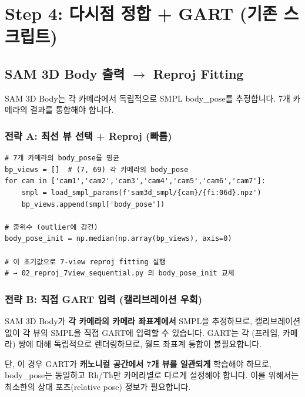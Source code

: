 \documentclass[11pt, a4paper]{report}
\begin{document}
\chapter{Step 4: 다시점 정합 + GART (기존 스크립트)}

\section{SAM 3D Body 출력 $\to$ Reproj Fitting}

SAM 3D Body는 각 카메라에서 독립적으로 SMPL body\_pose를 추정합니다. 7개 카메라의 결과를 통합해야 합니다.

\subsection{전략 A: 최선 뷰 선택 + Reproj (빠름)}

\begin{codebox}[title={7-view 평균 body\_pose $\to$ reproj 정제}]
\begin{verbatim}
# 7개 카메라의 body_pose를 평균
bp_views = []  # (7, 69) 각 카메라의 body_pose
for cam in ['cam1','cam2','cam3','cam4','cam5','cam6','cam7']:
    smpl = load_smpl_params(f'sam3d_smpl/{cam}/{fi:06d}.npz')
    bp_views.append(smpl['body_pose'])

# 중위수 (outlier에 강건)
body_pose_init = np.median(np.array(bp_views), axis=0)

# 이 초기값으로 7-view reproj fitting 실행
# → 02_reproj_7view_sequential.py 의 body_pose_init 교체
\end{verbatim}
\end{codebox}

\subsection{전략 B: 직접 GART 입력 (캘리브레이션 우회)}

\begin{keyidea}
SAM 3D Body가 \textbf{각 카메라의 카메라 좌표계에서} SMPL을 추정하므로, 캘리브레이션 없이 각 뷰의 SMPL을 직접 GART에 입력할 수 있습니다. GART는 각 (프레임, 카메라) 쌍에 대해 독립적으로 렌더링하므로, 월드 좌표계 통합이 불필요합니다.
\end{keyidea}

\begin{warningbox}
단, 이 경우 GART가 \textbf{캐노니컬 공간에서 7개 뷰를 일관되게} 학습해야 하므로, body\_pose는 동일하고 Rh/Th만 카메라별로 다르게 설정해야 합니다. 이를 위해서는 최소한의 상대 포즈(relative pose) 정보가 필요합니다.
\end{warningbox}
\end{document}
